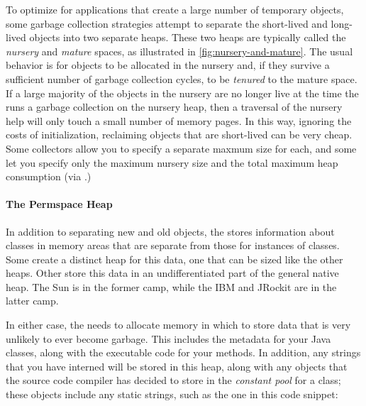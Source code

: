 To optimize for applications that create a large number of temporary objects,
some garbage collection strategies attempt to separate the short-lived and
long-lived objects into two separate heaps. These two heaps are typically called
the \emph{nursery} and \emph{mature} spaces, as illustrated in
\autoref{fig:nursery-and-mature}. The usual behavior is for objects to be
allocated in the nursery and, if they survive a sufficient number of garbage
collection cycles, to be \emph{tenured} to the mature space. If a large majority
of the objects in the nursery are no longer live at the time the \jre runs a
garbage collection on the nursery heap, then a traversal of the nursery help will
only touch a small number of memory pages. In this way, ignoring the costs of
initialization, reclaiming objects that are short-lived can be very cheap. Some
collectors allow you to specify a separate maxmum size for each, and some let you
specify only the maximum nursery size and the total maximum heap consumption (via
.)

\paragraph{The Permspace Heap}
In addition to separating new and old objects, the \jre stores information about
classes in memory areas that are separate from those for instances of classes.
Some \jres create
a distinct heap for this data, one that can be sized like the other heaps.
Other \jres store this data in an undifferentiated part of the general native
heap. The Sun \jre is in the former camp, while the IBM and JRockit \jres are in
the latter camp.

In either case, the \jre needs to allocate memory
 in which to store data that is very unlikely to ever become
garbage. This includes the \jres metadata for your Java classes, along with the
executable code for your methods. In addition, any strings that you have
interned will be stored in this heap, along with any objects that the source
code compiler has decided to store in the \emph{constant pool} for a class;
these objects include any static strings, such as the one in this code snippet:

